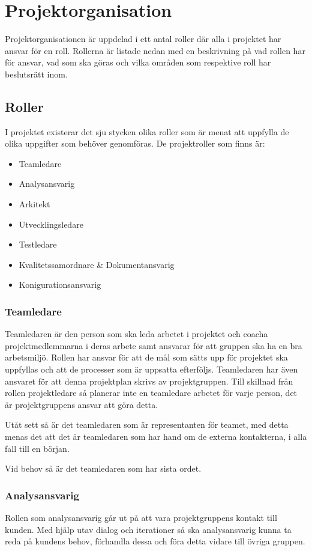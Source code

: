 \documentclass[a4paper,10pt]{article}
\begin{document}
\section{Projektorganisation}
Projektorganisationen är uppdelad i ett antal roller där alla i projektet har ansvar för en roll. Rollerna är listade nedan med en beskrivning på vad rollen har för ansvar, vad som ska göras och vilka områden som respektive roll har beslutsrätt inom.
\subsection{Roller}
I projektet existerar det sju stycken olika roller som är menat att uppfylla de olika uppgifter som behöver genomföras. De projektroller som finns är:
\begin{itemize}
\item Teamledare
\item Analysansvarig
\item Arkitekt
\item Utvecklingsledare
\item Testledare
\item Kvalitetssamordnare \& Dokumentansvarig
\item Konigurationsansvarig
\end{itemize}
\subsubsection{Teamledare}
Teamledaren är den person som ska leda arbetet i projektet och coacha projektmedlemmarna i deras arbete samt ansvarar för att gruppen ska ha en bra arbetsmiljö. Rollen har ansvar för att de mål som sätts upp för projektet ska uppfyllas och att de processer som är uppsatta efterföljs. Teamledaren har även ansvaret för att denna projektplan skrivs av projektgruppen. Till skillnad från rollen projektledare så planerar inte en teamledare arbetet för varje person, det är projektgruppens ansvar att göra detta.

Utåt sett så är det teamledaren som är representanten för teamet, med detta menas det att det är teamledaren som har hand om de externa kontakterna, i alla fall till en början.

Vid behov så är det teamledaren som har sista ordet.
\subsubsection{Analysansvarig}
Rollen som analysansvarig går ut på att vara projektgruppens kontakt till kunden. Med hjälp utav dialog och iterationer så ska analysansvarig kunna ta reda på kundens behov, förhandla dessa och föra detta vidare till övriga gruppen.
\end{document}
